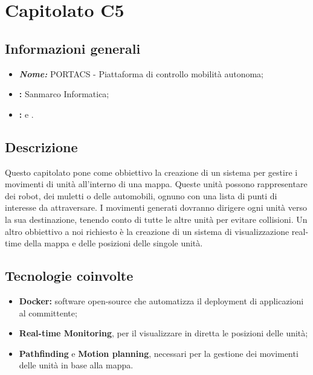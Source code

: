 \section{Capitolato C5}

\subsection{Informazioni generali}
\begin{itemize}
\item \textbf{\emph{Nome:}} PORTACS - Piattaforma di controllo mobilità autonoma;
\item \textbf{\commitProg:} Sanmarco Informatica;
\item \textbf{\proponProg:} \VT{} e \CR.
\end{itemize}

\subsection{Descrizione}
Questo capitolato pone come obbiettivo la creazione di un sistema per gestire i movimenti di unità all'interno di una mappa. Queste unità possono rappresentare dei robot, dei muletti o delle automobili, ognuno con una lista di punti di interesse da attraversare. I movimenti generati dovranno dirigere ogni unità verso la sua destinazione, tenendo conto di tutte le altre unità per evitare collisioni.
Un altro obbiettivo a noi richiesto è la creazione di un sistema di visualizzazione real-time della mappa e delle posizioni delle singole unità.

\subsection{Tecnologie coinvolte}
\begin{itemize}
\item \textbf{Docker:} software open-source che automatizza il deployment di applicazioni al committente;
\item \textbf{Real-time Monitoring}, per il visualizzare in diretta le posizioni delle unità;
\item \textbf{Pathfinding} e \textbf{Motion planning}, necessari per la gestione dei movimenti delle unità in base alla mappa.
\end{itemize}

